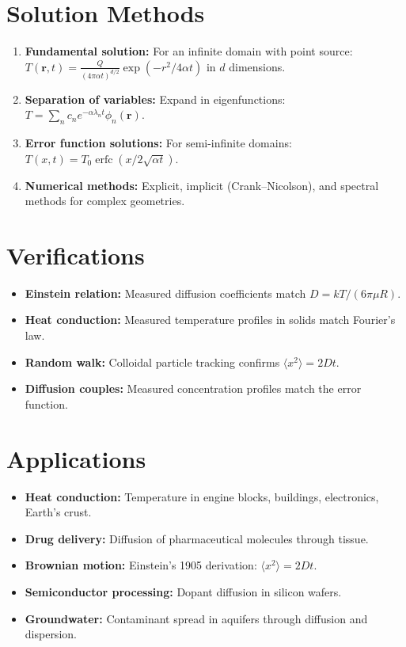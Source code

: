 \documentclass[11pt,openright]{book}
\begin{document}
\section*{Solution Methods}

\begin{enumerate}
\item \textbf{Fundamental solution:} For an infinite domain with point source: $T(\mathbf{r}, t) = \frac{Q}{(4\pi \alpha t)^{d/2}} \exp(-r^2 / 4\alpha t)$ in $d$ dimensions.
\item \textbf{Separation of variables:} Expand in eigenfunctions: $T = \sum_n c_n e^{-\alpha \lambda_n t} \phi_n(\mathbf{r})$.
\item \textbf{Error function solutions:} For semi-infinite domains: $T(x, t) = T_0 \operatorname{erfc}(x / 2\sqrt{\alpha t})$.
\item \textbf{Numerical methods:} Explicit, implicit (Crank--Nicolson), and spectral methods for complex geometries.
\end{enumerate}
\section*{Verifications}

\begin{itemize}
\item \textbf{Einstein relation:} Measured diffusion coefficients match $D = kT/(6\pi\mu R)$.
\item \textbf{Heat conduction:} Measured temperature profiles in solids match Fourier's law.
\item \textbf{Random walk:} Colloidal particle tracking confirms $\langle x^2 \rangle = 2Dt$.
\item \textbf{Diffusion couples:} Measured concentration profiles match the error function.
\end{itemize}
\section*{Applications}

\begin{itemize}
\item \textbf{Heat conduction:} Temperature in engine blocks, buildings, electronics, Earth's crust.
\item \textbf{Drug delivery:} Diffusion of pharmaceutical molecules through tissue.
\item \textbf{Brownian motion:} Einstein's 1905 derivation: $\langle x^2 \rangle = 2Dt$.
\item \textbf{Semiconductor processing:} Dopant diffusion in silicon wafers.
\item \textbf{Groundwater:} Contaminant spread in aquifers through diffusion and dispersion.
\end{itemize}
\end{document}
